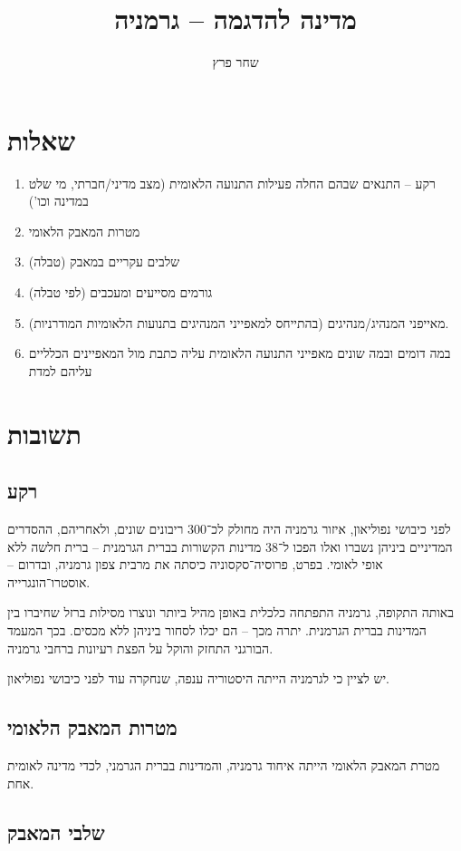 \documentclass[]{article}
\author{שחר פרץ}
\title{מדינה להדגמה – גרמניה}
\begin{document}
	\maketitle
	\section{שאלות}
	
	\begin{enumerate}
		\item רקע – התנאים שבהם החלה פעילות התנועה הלאומית (מצב מדיני/חברתי, מי שלט במדינה וכו')
		\item מטרות המאבק הלאומי
		\item שלבים עקריים במאבק (טבלה)
		\item גורמים מסייעים ומעכבים (לפי טבלה)
		\item מאייפני המנהיג/מנהיגים (בהתייחס למאפייני המנהיגים בתנועות הלאומיות המודרניות). 
		\item במה דומים ובמה שונים מאפייני התנועה הלאומית עליה כתבת מול המאפיינים הכלליים עליהם למדת
	\end{enumerate}
	
	\section{תשובות}
	
	\subsection{רקע}
	לפני כיבושי נפוליאון, איזור גרמניה היה מחולק לכ־300 ריבונים שונים, ולאחריהם, ההסדרים המדיניים ביניהן נשברו ואלו הפכו ל־38 מדינות הקשורות בברית הגרמנית – ברית חלשה ללא אופי לאומי. בפרט, פרוסיה־סקסוניה כיסתה את מרבית צפון גרמניה, ובדרום – אוסטרו־הונגרייה. 
	
	באותה התקופה, גרמניה התפתחה כלכלית באופן מהיל ביותר ונוצרו מסילות ברזל שחיברו בין המדינות בברית הגרמנית. יתרה מכך – הם יכלו לסחור ביניהן ללא מכסים. בכך המעמד הבורגני התחזק והוקל על הפצת רעיונות ברחבי גרמניה. 
	
	יש לציין כי לגרמניה הייתה היסטוריה ענפה, שנחקרה עוד לפני כיבושי נפוליאון. 
	
	\subsection{מטרות המאבק הלאומי}
	מטרת המאבק הלאומי הייתה איחוד גרמניה, והמדינות בברית הגרמני, לכדי מדינה לאומית אחת. 
	\subsection{שלבי המאבק}
\end{document}
